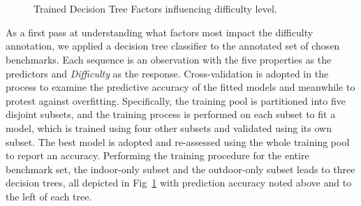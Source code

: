 \begin{figure}[th!]
  \centering
    \\
    \\
  \caption{Trained Decision Tree Factors influencing difficulty level.} \label{fig:dtree1}
  \vspace*{-2em}
\end{figure}


As a first pass at understanding what factors most impact the difficulty
annotation, we applied a decision tree classifier to the annotated set of
chosen benchmarks.  Each sequence is an observation with the 
five
 properties as the predictors and \textit{Difficulty}
as the response. 
Cross-validation is adopted in the process to examine the predictive
accuracy of the fitted models and meanwhile to protest against overfitting.
Specifically, the training pool is partitioned into five disjoint subsets,
and the training process is performed on each subset to fit a model, which
is trained using four other subsets and validated using its own subset.
The best model is adopted and re-assessed using the whole training 
pool to report an accuracy.
Performing the training procedure for the entire benchmark set, the
indoor-only subset and the outdoor-only subset leads to three decision
trees, all depicted in Fig~\ref{fig:dtree1} with prediction accuracy noted 
above and to the left of each tree. 


